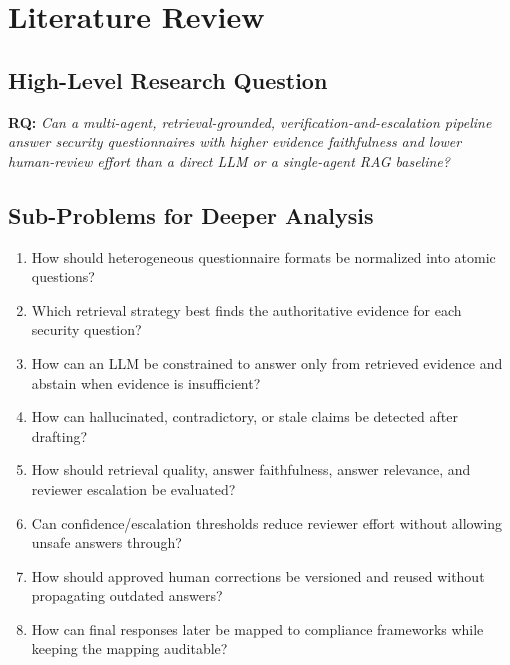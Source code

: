 \documentclass[11pt,journal,onecolumn]{IEEEtran}
\begin{document}
\section{Literature Review}
\label{sec:litreview}

\subsection{High-Level Research Question}
\textbf{RQ:} \emph{Can a multi-agent, retrieval-grounded, verification-and-escalation pipeline answer security questionnaires with higher evidence faithfulness and lower human-review effort than a direct LLM or a single-agent RAG baseline?}

\subsection{Sub-Problems for Deeper Analysis}
\begin{enumerate}[leftmargin=1.7em]
    \item How should heterogeneous questionnaire formats be normalized into atomic questions?
    \item Which retrieval strategy best finds the authoritative evidence for each security question?
    \item How can an LLM be constrained to answer only from retrieved evidence and abstain when evidence is insufficient?
    \item How can hallucinated, contradictory, or stale claims be detected after drafting?
    \item How should retrieval quality, answer faithfulness, answer relevance, and reviewer escalation be evaluated?
    \item Can confidence/escalation thresholds reduce reviewer effort without allowing unsafe answers through?
    \item How should approved human corrections be versioned and reused without propagating outdated answers?
    \item How can final responses later be mapped to compliance frameworks while keeping the mapping auditable?
\end{enumerate}
\end{document}
